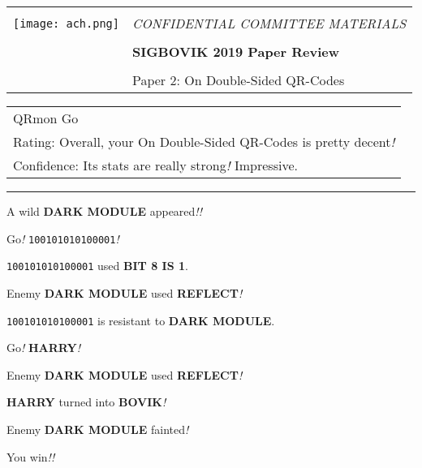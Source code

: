 \documentclass[12pt]{article}
\begin{document}
{\sffamily
\begin{tabular}{ll}
\multirow{3}{*}{\texttt{[image: ach.png]}}\\
& \Large{\em CONFIDENTIAL COMMITTEE MATERIALS} \\
&\\
& \textbf{\Huge{SIGBOVIK 2019 Paper Review}} \\
&\\
& \LARGE{Paper 2: On Double-Sided QR-Codes}
\\
\hline
\end{tabular}}
\vspace{2em}
\thispagestyle{empty}

{\large\bf
\begin{tabular}{l}
QRmon Go\\
Rating: Overall, your On Double-Sided QR-Codes is pretty decent\textit{!}\\
Confidence: Its stats are really strong\textit{!} Impressive.\\
\end{tabular}}
\vspace{1em}


\begin{center}
\rule{1in}{1in}

A wild \textbf{DARK MODULE} appeared\textit{!!}
\end{center}

Go\textit{!} \texttt{100101010100001}\textit{!}

\texttt{100101010100001} used \textbf{BIT 8 IS 1}.

\begin{flushright}
Enemy \textbf{DARK MODULE} used \textbf{REFLECT}\textit{!}
\end{flushright}

\texttt{100101010100001} is resistant to \textbf{DARK MODULE}.

Go\textit{!} \textbf{HARRY}\textit{!}

\begin{flushright}
Enemy \textbf{DARK MODULE} used \textbf{REFLECT}\textit{!}
\end{flushright}

\textbf{HARRY} turned into \textbf{BOVIK}\textit{!}

\begin{flushright}
Enemy \textbf{DARK MODULE} fainted\textit{!}
\end{flushright}

\begin{center}
You win\textit{!!}
\end{center}
\end{document}
